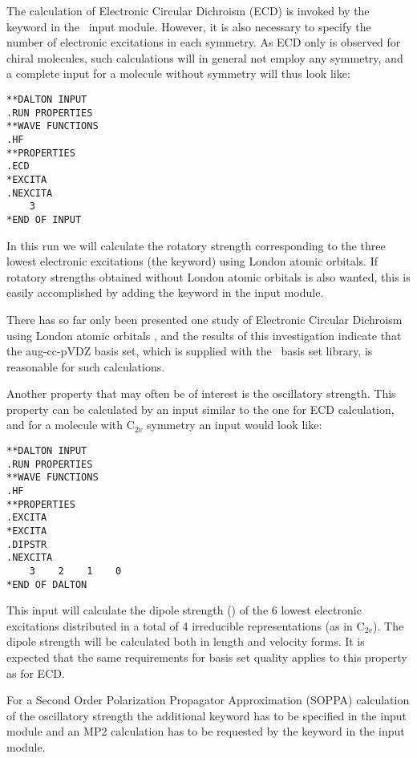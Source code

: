 The calculation of Electronic Circular Dichroism
(ECD) is invoked by 
the keyword  in the \aba\ input module. However,
it is also necessary to specify the number of electronic
excitations in 
each symmetry. As ECD only is observed for chiral molecules, such
calculations will in general not employ any symmetry, and a complete
input for a molecule without symmetry will thus look like:

\begin{verbatim}
**DALTON INPUT
.RUN PROPERTIES
**WAVE FUNCTIONS
.HF
**PROPERTIES
.ECD
*EXCITA
.NEXCITA
    3
*END OF INPUT
\end{verbatim}

In this run we will calculate the rotatory strength corresponding to 
the three lowest electronic excitations
(the  keyword) 
using London atomic orbitals. 
If rotatory strengths obtained without London atomic orbitals is also
wanted, this is easily accomplished by adding the keyword
 in the  input module.

There has so far only been presented one study of Electronic Circular
Dichroism using London atomic orbitals \cite{klbaehkrthjopjtca90}, and the
results of this investigation indicate that the aug-cc-pVDZ basis
set, which is supplied with the \siraba\ basis set library, is
reasonable for such calculations. 

Another property that may often be of interest is the
oscillatory strength. This property can be
calculated by an input 
similar to the one for ECD calculation, and for a molecule with
C$_{2v}$ symmetry an input would look like:

\begin{verbatim}
**DALTON INPUT
.RUN PROPERTIES
**WAVE FUNCTIONS
.HF
**PROPERTIES
.EXCITA
*EXCITA
.DIPSTR
.NEXCITA
    3    2    1    0
*END OF DALTON
\end{verbatim}

This input will calculate the dipole strength () of the
6 lowest electronic excitations distributed in a total of 4
irreducible representations (as in C$_{2v}$). The dipole strength will
be calculated both in 
length and velocity forms. It is expected that the same requirements
for basis set quality applies to this property as for ECD.

For a Second Order Polarization Propagator Approximation (SOPPA) 
\cite{esnpjjodjcp73,jodpjdycpr2,mjpekdtehjajjojcp} calculation of the 
oscillatory strength the additional keyword  has to be specified 
in the  
input module and an MP2 calculation has to be requested by the keyword 
 in the  input module. 

